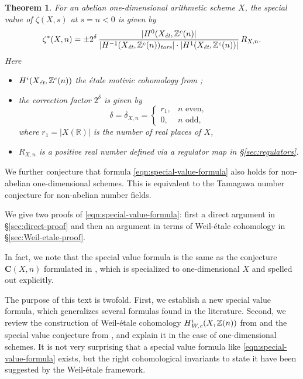 \documentclass[draft]{article}
\newcommand{\RR}{\mathbb{R}}
\newcommand{\ZZ}{\mathbb{Z}}
\newcommand{\et}{\text{\it \'{e}t}}
\newcommand{\tors}{\text{\it tors}}
\newcommand{\Wc}{\text{\it W,c}}
\theoremstyle{myplain}
\newtheorem{theorem}{Theorem}[section]
\theoremstyle{mydefinition}
\numberwithin{equation}{section}
\begin{document}
\begin{theorem}
  \label{main-theorem}
  For an abelian one-dimensional arithmetic scheme $X$, the special value of
  $\zeta (X,s)$ at $s = n < 0$ is given by
  \begin{equation}
    \label{eqn:special-value-formula}
    \zeta^* (X,n) =
    \pm 2^\delta\,\frac{|H^0 (X_\et, \ZZ^c (n)|}{|H^{-1} (X_\et, \ZZ^c (n))_\tors| \cdot |H^1 (X_\et, \ZZ^c (n))|}\,R_{X,n}.
  \end{equation}
  Here
  \begin{itemize}
  \item $H^i (X_\et, \ZZ^c (n))$ the \'{e}tale motivic cohomology
    from \cite{Geisser-2010};

  \item the correction factor $2^\delta$ is given by
    \begin{equation}
      \label{eqn:delta}
      \delta = \delta_{X,n} =
      \begin{cases}
        r_1, & n \text{ even}, \\
        0, & n \text{ odd},
      \end{cases}
    \end{equation}
    where $r_1 = |X (\RR)|$ is the number of real places of $X$,

  \item $R_{X,n}$ is a positive real number defined
    via a regulator map in \S\ref{sec:regulators}.
  \end{itemize}
\end{theorem}

We further conjecture that formula \eqref{eqn:special-value-formula} also holds
for non-abelian one-dimensional schemes. This is equivalent to the Tamagawa
number conjecture for non-abelian number fields.

\vspace{1em}

We give two proofs of \eqref{eqn:special-value-formula}: first a direct argument
in \S\ref{sec:direct-proof} and then an argument in terms of Weil-\'{e}tale
cohomology in \S\ref{sec:Weil-etale-proof}.

In fact, we note that the special value formula is the same as the conjecture
$\mathbf{C} (X,n)$ formulated in \cite{Beshenov-Weil-etale-2}, which is
specialized to one-dimensional $X$ and spelled out explicitly.

The purpose of this text is twofold. First, we establish a new special value
formula, which generalizes several formulas found in the literature. Second, we
review the construction of Weil-\'{e}tale cohomology $H^i_\Wc (X, \ZZ(n))$ from
\cite{Beshenov-Weil-etale-1} and the special value conjecture from
\cite{Beshenov-Weil-etale-2}, and explain it in the case of one-dimensional
schemes. It is not very surprising that a special value formula like
\eqref{eqn:special-value-formula} exists, but the right cohomological invariants
to state it have been suggested by the Weil-\'{e}tale framework.
\end{document}
